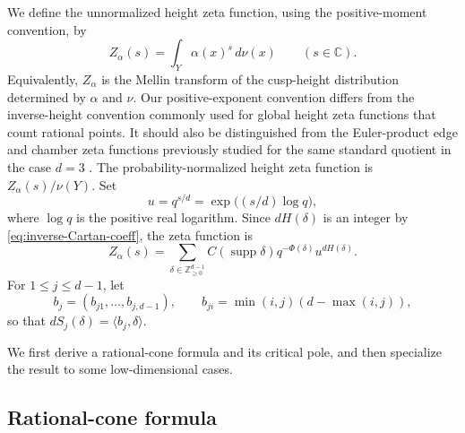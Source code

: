 \documentclass[11pt]{amsart}
\newcommand{\ZZ}{\mathbb Z}
\newcommand{\CC}{\mathbb C}
\newcommand{\supp}{\operatorname{supp}}
\theoremstyle{plain}
\theoremstyle{definition}
\numberwithin{equation}{section}
\begin{document}
We define the unnormalized height zeta function, using the positive-moment
convention, by
\begin{equation}\label{eq:zeta-s}
  Z_\alpha(s)=\int_Y\alpha(x)^s\,d\nu(x)
  \qquad (s\in\CC).
\end{equation}
Equivalently, \(Z_\alpha\) is the Mellin transform of the cusp-height distribution
determined by \(\alpha\) and \(\nu\).  Our positive-exponent convention differs from the
inverse-height convention commonly used for global height zeta functions that count
rational points.  It should also be distinguished from the Euler-product edge and chamber
zeta functions previously studied for the same standard quotient in the case \(d=3\)
\cite{HongKwonEdgeZeta,HongKwonChamberZeta}.
The probability-normalized height zeta function is $Z_\alpha(s)/\nu(Y)$.  Set
\begin{equation}\label{eq:u-variable}
  u=q^{s/d}=\exp\bigl((s/d)\log q\bigr),
\end{equation}
where $\log q$ is the positive real logarithm.  Since $dH(\delta)$ is an integer by
\eqref{eq:inverse-Cartan-coeff}, the zeta function is
\begin{equation}\label{eq:zeta-delta}
  Z_\alpha(s)
  =
  \sum_{\delta\in\ZZ_{\ge0}^{d-1}}
  C(\supp\delta)q^{-\Phi(\delta)}u^{dH(\delta)}.
\end{equation}
For $1\le j\le d-1$, let
\begin{equation}\label{eq:b-vector}
  b_j=(b_{j1},\ldots,b_{j,d-1}),
  \qquad
  b_{ji}=\min(i,j)(d-\max(i,j)),
\end{equation}
so that $dS_j(\delta)=\langle b_j,\delta\rangle$.

We first derive a rational-cone formula and its critical pole, and then specialize
the result to some low-dimensional cases.

\subsection{Rational-cone formula}
\end{document}
